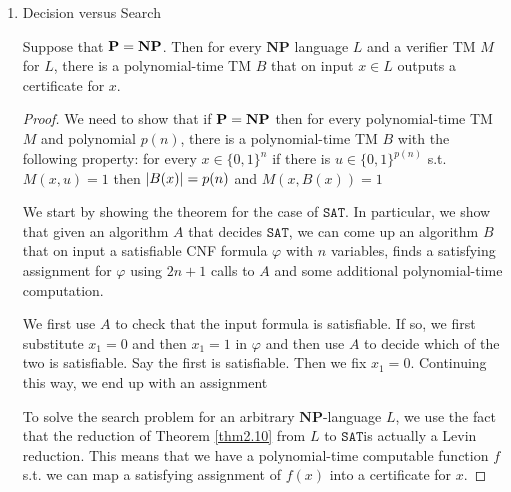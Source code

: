 \documentclass[11pt]{article}
\def \NP {\textbf{NP}}
\def \SAT {\text{SAT}}
\def \start {\text{start}}
\def \tend {\text{end}}
\def \NP {\textbf{NP}}
\def \SAT {\texttt{SAT}}
\def \dHAMPATH {\texttt{dHAMPATH}}
\begin{document}
\begin{enumerate}
\begin{proof}
If \(C\) contains the literal \(u_j\), then we take two neighboring
vertices \(v_i\), \(v_{i+1}\) in the \(j\)th chain and put an edge from \(v_i\) to \(C\) and
from \(C\) to \(v_{i+1}\). If \(C\) contains the literal \(\baru_j\) then we construct these
edges in the opposite direction. When adding these edges, we never "reuse" a
link \(v_i, v_{i+1}\) in a particular chain and always keep an unused link between every two
used links.


\(G\in\dHAMPATH\Rightarrow\varphi\in\SAT\). Suppose that \(G\) has an Hamiltonian path \(P\).
We first note that the path \(P\) must start in \(v_{\start}\) and end at \(v_{\tend}\).
Furthermore, we claim that \(P\) needs to traverse all the chains in order and, within each
each chain, traverse it either in left-to-right order or right-to-left order.
\end{proof}

\item Decision versus Search
\label{sec:org8edd037}
\begin{theorem}[]
\label{thm2.18}
Suppose that \(\bP=\NP\). Then for every \(\NP\) language \(L\) and a verifier TM \(M\)
for \(L\), there is a polynomial-time TM \(B\) that on input \(x\in L\) outputs a certificate
for \(x\).
\end{theorem}

\begin{proof}
We need to show that if \(\bP=\NP\) then for every polynomial-time TM \(M\) and
polynomial \(p(n)\), there is a polynomial-time TM \(B\) with the following property: for every
\(x\in\{0,1\}^n\) if there is \(u\in\{0,1\}^{p(n)}\) s.t. \(M(x,u)=1\) then \(\abs{B(x)}=p(n)\)
and \(M(x,B(x))=1\)

We start by showing the theorem for the case of \(\SAT\). In particular, we show that given an
algorithm \(A\) that decides \(\SAT\), we can come up an algorithm \(B\) that on input a
satisfiable CNF formula \(\varphi\) with \(n\) variables, finds a satisfying assignment for \(\varphi\)
using \(2n+1\) calls to \(A\) and some additional polynomial-time computation.

We first use \(A\) to check that the input formula is satisfiable. If so, we first
substitute \(x_1=0\) and then \(x_1=1\) in \(\varphi\) and then use \(A\) to decide which of the two is
satisfiable. Say the first is satisfiable. Then we fix \(x_1=0\). Continuing this way, we end
up with an assignment

To solve the search problem for an arbitrary \(\NP\)-language \(L\), we use the fact that the
reduction of Theorem \ref{thm2.10} from \(L\) to \(\SAT\)is actually a Levin reduction. This
means that we have a polynomial-time computable function \(f\) s.t. we can map a satisfying
assignment of \(f(x)\) into a certificate for \(x\).
\end{proof}


\end{enumerate}
\end{document}
